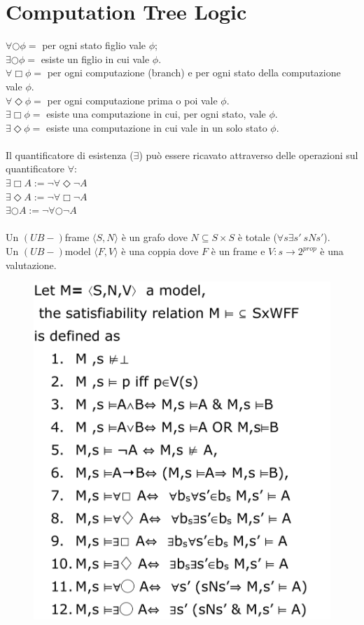 \documentclass[a4paper, notitlepage, 9pt]{extreport}
\begin{document}
\chapter*{Computation Tree Logic}
\begin{multicols}{2}
	\noindent
$\forall \bigcirc \phi =$ per ogni stato figlio vale $\phi$;\\
$\exists \bigcirc \phi =$ esiste un figlio in cui vale $\phi$.\\
$\forall \Box \phi =$ per ogni computazione (branch) e per ogni stato della computazione vale $\phi$.\\
$\forall \Diamond \phi =$ per ogni computazione prima o poi vale $\phi$.\\
$\exists \Box \phi =$ esiste una computazione in cui, per ogni stato, vale $\phi$.\\
$\exists \Diamond \phi =$ esiste una computazione in cui vale in un solo stato $\phi$.\\\\
Il quantificatore di esistenza ($\exists$) può essere ricavato attraverso delle operazioni sul quantificatore $\forall$:\\
$\exists \Box A := \lnot\forall \Diamond \lnot A$\\
$\exists \Diamond A := \lnot\forall \Box \lnot A$\\
$\exists \bigcirc A := \lnot\forall \bigcirc \lnot A$\\\\
Un $(UB-)$frame $\langle S, N \rangle$  è un grafo dove $N\subseteq S \times S$ è totale ($\forall s \exists s' ~sNs'$).\\
Un $(UB-)$model $\langle F, V \rangle$  è una coppia dove $F$ è un frame e $V: s\rightarrow 2^{prop}$ è una valutazione.
\columnbreak
\begin{figure}[H]
	\centering
	\includegraphics[scale=0.25]{CTL}

\end{figure}
\end{multicols}
\end{document}
